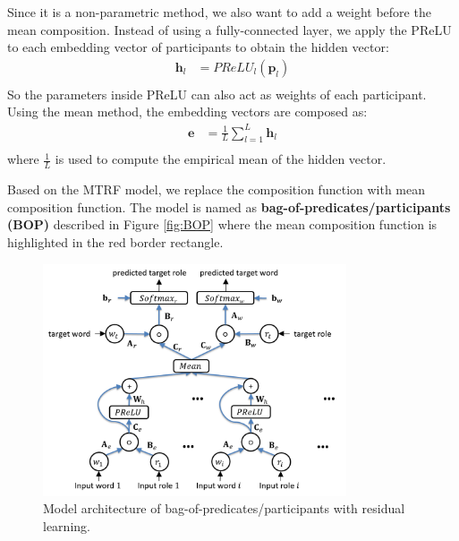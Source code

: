 \documentclass[a4paper]{article}
\begin{document}
Since it is a non-parametric method, we also want to add a weight before the mean composition. Instead of using a fully-connected layer, we apply the PReLU to each embedding vector of participants to obtain the hidden vector: 
\begin{equation} \label{eq:nonlinearity-bop}
\begin{aligned}
    \mathbf{h}_l
        &= PReLU_l(\mathbf{p}_l) \\
\end{aligned}
\end{equation}
So the parameters inside PReLU can also act as weights of each participant. Using the mean method, the embedding vectors are composed as:
\begin{equation} \label{eq:mean-comp-bop}
\begin{aligned}
    \mathbf{e}
        &= \frac{1}{L} \sum_{l=1}^{L} \mathbf{h}_{l} \\
\end{aligned}
\end{equation}
where $\frac{1}{L}$ is used to compute the empirical mean of the hidden vector. 

Based on the MTRF model, we replace the composition function with mean composition function. The model is named as \textbf{bag-of-predicates/participants (BOP)} described in Figure \ref{fig:BOP} where the mean composition function is highlighted in the red border rectangle. 


\begin{figure}[t]
\centering
\includegraphics[width=0.8\textwidth]{BOPRes.png}
\caption{\label{fig:BOPRes} Model architecture of bag-of-predicates/participants with residual learning.}
\end{figure}

% 
% 
% 
% 
% 
%
\end{document}
